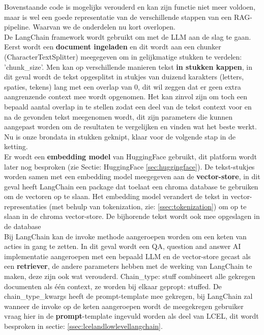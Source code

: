 Bovenstaande code is mogelijks verouderd en kan zijn functie niet meer voldoen, maar is wel een goede representatie van de verschillende stappen van een RAG-pipeline. Waarvan we de onderdelen nu kort overlopen. \\

De LangChain framework wordt gebruikt om met de LLM aan de slag te gaan. Eerst wordt een \textbf{document ingeladen} en dit wordt aan een chunker (CharacterTextSplitter) meegegeven om in gelijkmatige stukken te verdelen: 'chunk\_size'. Men kan op verschillende manieren tekst \textbf{in stukken kappen}, in dit geval wordt de tekst opgesplitst in stukjes van duizend karakters (letters, spaties, tekens) lang met een overlap van 0, dit wil zeggen dat er geen extra aangrenzende context mee wordt opgenomen. Het kan zinvol zijn om toch een bepaald aantal overlap in te stellen zodat een deel van de tekst context voor en na de gevonden tekst meegenomen wordt, dit zijn parameters die kunnen aangepast worden om de resultaten te vergelijken en vinden wat het beste werkt. Nu is onze brondata in stukken geknipt, klaar voor de volgende stap in de ketting. \\

Er wordt een \textbf{embedding model} van HuggingFace gebruikt, dit platform wordt later nog besproken (zie Sectie: HuggingFace \ref{sec:huggingface}). De tekst-stukjes worden samen met een embedding model meegegeven aan de \textbf{vector-store}, in dit geval heeft LangChain een package dat toelaat een chroma database te gebruiken om de vectoren op te slaan. Het embedding model verandert de tekst in vector-representaties (met behulp van tokenization, zie: \ref{ssec:tokenization}) om op te slaan in de chroma vector-store. De bijhorende tekst wordt ook mee opgeslagen in de database \\

Bij LangChain kan de invoke methode aangeroepen worden om een keten van acties in gang te zetten. In dit geval wordt een QA, question and answer AI implementatie aangeroepen met een bepaald LLM en de vector-store gecast als een \textbf{retriever}, de andere parameters hebben met de werking van LangChain te maken, deze zijn ook wat verouderd. Chain\_type: stuff combineert alle gekregen documenten als één context, ze worden bij elkaar gepropt: stuffed. De chain\_type\_kwargs heeft de prompt-template mee gekregen, bij LangChain zal wanneer de invoke op de keten aangeroepen wordt de meegekregen gebruiker vraag hier in de \textbf{prompt}-template ingevuld worden als deel van LCEL, dit wordt besproken in sectie: \ref{ssec:lcelandlowlevellangchain}. \\

